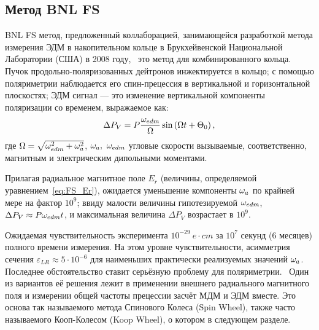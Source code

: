\newcommand{\wimp}{\w_{\avg{E_v}}}
\newcommand{\wsw}{\w_{SW}}
\newcommand{\wedm}{\w_{edm}}

\newcommand{\D}{\Delta}

\subsection{Метод BNL FS}
BNL FS метод, предложенный коллаборацией, занимающейся разработкой
метода измерения ЭДМ в накопительном кольце в Брукхейвенской
Национальной Лаборатории (США) в 2008 году,~\cite{BNL:Deuteron2008}
это метод для комбинированного кольца. Пучок продольно-поляризованных
дейтронов инжектируется в кольцо; с помощью поляриметрии наблюдается
его спин-прецессия в вертикальной и горизонтальной плоскостях; ЭДМ
сигнал --- это изменение вертикальной компоненты поляризации со
временем, выражаемое как:~\cite[стр.~8]{BNL:Deuteron2008}
\begin{equation}
  \Delta P_V = P\frac{\w_{edm}}{\W}\sin\bkt{\W t + \Theta_0},
\end{equation}
где $\Omega = \sqrt{\omega_{edm}^2 + \omega_a^2}$, $\omega_a,~\omega_{edm}$ угловые
скорости вызываемые, соответственно, магнитным и электрическим
дипольными моментами.

Прилагая радиальное магнитное поле $E_r$ (величины, определяемой уравнением~\eqref{eq:FS_Er}), ожидается
уменьшение компоненты $\omega_a$ по крайней мере на фактор $10^9$; ввиду
малости величины гипотезируемой $\omega_{edm}$, $\Delta P_V \approx P
\omega_{edm} t$, и максимальная величина $\Delta P_V$ возрастает в $10^9$.

Ожидаемая чувствительность эксперимента $10^{-29}~e\cdot cm$ за $10^7$
секунд (6 месяцев) полного времени измерения. На этом уровне
чувствительности, асимметрия сечения $\varepsilon_{LR} \approx 5\cdot
10^{-6}$ для наименьших практически реализуемых значений
$\omega_a$.~\cite[стр.~18]{BNL:Deuteron2008} Последнее обстоятельство
ставит серьёзную проблему для поляриметрии.~\cite{Mane:SpinWheel} Один
из вариантов её решения лежит в применении внешнего радиального
магнитного поля и измерении общей частоты прецессии засчёт МДМ и ЭДМ
вместе. Это основа так называемого метода Спинового Колеса (Spin Wheel), также 
часто называемого Кооп-Колесом (Koop Wheel), о котором в
следующем разделе. 

